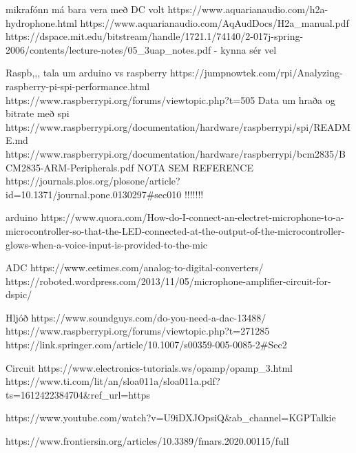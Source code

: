 mikrafónn má bara vera með DC volt
https://www.aquarianaudio.com/h2a-hydrophone.html
https://www.aquarianaudio.com/AqAudDocs/H2a_manual.pdf
https://dspace.mit.edu/bitstream/handle/1721.1/74140/2-017j-spring-2006/contents/lecture-notes/05_3uap_notes.pdf - kynna sér vel


Raspb,,, tala um arduino vs raspberry
https://jumpnowtek.com/rpi/Analyzing-raspberry-pi-spi-performance.html
https://www.raspberrypi.org/forums/viewtopic.php?t=505                      Data um hraða og bitrate með spi
https://www.raspberrypi.org/documentation/hardware/raspberrypi/spi/README.md
https://www.raspberrypi.org/documentation/hardware/raspberrypi/bcm2835/BCM2835-ARM-Peripherals.pdf NOTA SEM REFERENCE 
https://journals.plos.org/plosone/article?id=10.1371/journal.pone.0130297#sec010
!!!!!!!

arduino
https://www.quora.com/How-do-I-connect-an-electret-microphone-to-a-microcontroller-so-that-the-LED-connected-at-the-output-of-the-microcontroller-glows-when-a-voice-input-is-provided-to-the-mic

ADC
https://www.eetimes.com/analog-to-digital-converters/
https://roboted.wordpress.com/2013/11/05/microphone-amplifier-circuit-for-dspic/

Hljóð
https://www.soundguys.com/do-you-need-a-dac-13488/
https://www.raspberrypi.org/forums/viewtopic.php?t=271285
https://link.springer.com/article/10.1007/s00359-005-0085-2#Sec2


Circuit
https://www.electronics-tutorials.ws/opamp/opamp_3.html
https://www.ti.com/lit/an/sloa011a/sloa011a.pdf?ts=1612422384704&ref_url=https%

https://www.youtube.com/watch?v=U9iDXJOpsiQ&ab_channel=KGPTalkie

https://www.frontiersin.org/articles/10.3389/fmars.2020.00115/full





